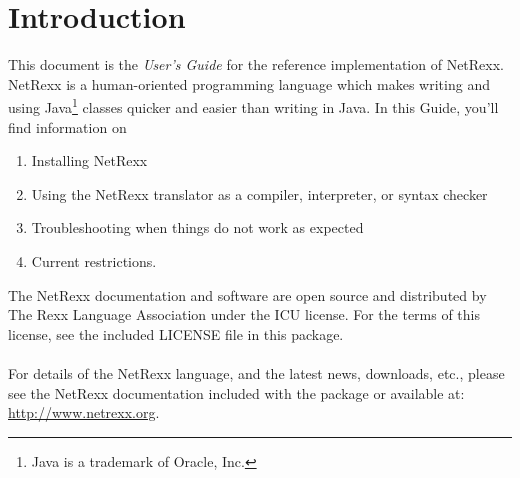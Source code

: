 \chapter{Introduction}
This document is the \emph{User’s Guide} for the reference implementation of
NetRexx. NetRexx is a human-oriented programming language which makes
writing and using Java\footnote{Java is a trademark of Oracle, Inc.} classes quicker and easier than writing in Java. 
In this Guide, you’ll find information on
\begin{enumerate} 
\item Installing NetRexx 
\item Using the NetRexx translator as a compiler, interpreter, or
  syntax checker 
\item Troubleshooting when things do not work as expected
\item Current restrictions.
\end{enumerate} 
The NetRexx documentation and software are open source and distributed by The Rexx Language Association under the \textsc{ICU} license. For the terms of this license, see the included \textsc{LICENSE} file in this package.\\\\
For details of the NetRexx language, and the latest news, downloads, etc., please see the NetRexx documentation included with the package or available at: \url{http://www.netrexx.org}.
